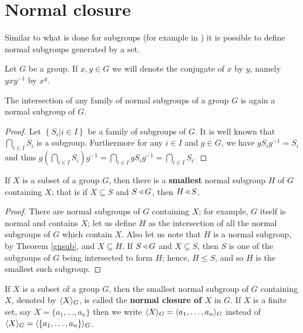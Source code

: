 \section{Normal closure}

Similar to what is done for subgroups (for example in \cite{RotmanITG}) it is possible to define normal subgroups generated by a set.

\begin{definition}
    Let $G$ be a group. If $x,y \in G$ we will denote the conjugate of $x$ by $y$, namely $yxy^{-1}$ by $x^{y}$.
\end{definition}

\begin{theorem}
    \label{gnsub}
    The intersection of any family of normal subgroups of a group $G$ is again a normal subgroup of $G$.
\end{theorem}

\begin{proof}
    Let $\left\{ S_i |i \in I \right\}$ be a family of subgroups of $G$. It is well known that $\bigcap_{i \in I} S_i$ is a subgroup. Furthermore for any $i \in I$ and $g \in G$, we have $gS_ig^{-1} = S_i$ and thus $g(\bigcap_{i \in I} S_i)g^{-1} = \bigcap_{i \in I} gS_ig^{-1} = \bigcap_{i \in I} S_i$.  
\end{proof}

\begin{theorem}
    If $X$ is a subset of a group $G$, then there is a \textbf{smallest} normal subgroup $H$ of $G$ containing $X$; that is if $X \subseteq S$ and $S \triangleleft G$, then $H \triangleleft S$.   
\end{theorem}

\begin{proof}
    There are normal subgroups of $G$ containing $X$; for example, $G$ itself is normal and contains $X$; let us define $H$ as the intersection of all the normal subgroups of $G$ which contain $X$. Also let us note that $H$ is a normal subgroup, by Theorem \ref{gnsub}, and $X \subseteq H$. If $S \triangleleft G$ and $X \subseteq S$, then $S$ is one of the subgroups of $G$ being intersected to form $H$; hence, $H \le S$, and so $H$ is the smallest such subgroup.
\end{proof}

\begin{definition}
    If $X$ is a subset of a group $G$, then the smallest normal subgroup of $G$ containing $X$, denoted by $\langle X \rangle_G$, is called the \textbf{normal closure of $X$} in $G$. If $X$ is a finite set, say $X = \{a_1, \ldots , a_n \}$ then we write $\langle X \rangle_G = \langle a_1, \ldots , a_n \rangle_G$ instead of $\langle X \rangle_G = \langle \left\{a_1, \ldots , a_n\right\} \rangle_G$.
\end{definition}

